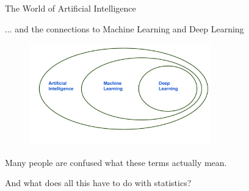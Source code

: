 \documentclass[11pt,compress,t,notes=noshow, xcolor=table]{beamer}
\begin{document}

\begin{frame}{The World of Artificial Intelligence}

... and the connections to Machine Learning and Deep Learning


\begin{center}

  \begin{figure}
    \includegraphics[width=0.7\textwidth]{figure_man/learning} 
  \end{figure}

  \lz

Many people are confused what these terms actually mean. 

\lz

And what does all this have to do with statistics?


%  
  
  \end{center}
  
\end{frame}

\end{document}
